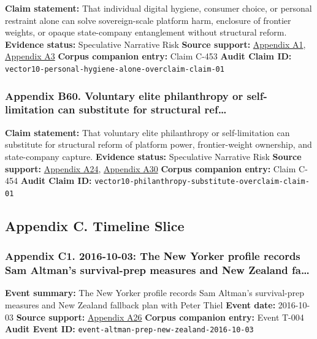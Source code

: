 \documentclass[
  american,
  11pt,
  letterpaper,
]{article}
\begin{document}
\textbf{Claim statement:} That individual digital hygiene, consumer
choice, or personal restraint alone can solve sovereign-scale platform
harm, enclosure of frontier weights, or opaque state-company
entanglement without structural reform. \textbf{Evidence status:}
Speculative Narrative Risk \textbf{Source support:}
\hyperref[appendix-a1-artificial-intelligence-and-the-future-of-teaching-and-learning-insights-and-recommendations]{Appendix
A1},
\hyperref[appendix-a3-interactions-between-artificial-intelligence-and-digital-public-infrastructure-concepts-benefits-and-challenges]{Appendix
A3} \textbf{Corpus companion entry:} Claim C-453 \textbf{Audit Claim
ID:} \texttt{vector10-personal-hygiene-alone-overclaim-claim-01}

\subsubsection{Appendix B60. Voluntary elite philanthropy or
self-limitation can substitute for structural
ref\ldots{}}\label{appendix-b60-voluntary-elite-philanthropy-or-self-limitation-can-substitute-for-structural-ref}

\textbf{Claim statement:} That voluntary elite philanthropy or
self-limitation can substitute for structural reform of platform power,
frontier-weight ownership, and state-company capture. \textbf{Evidence
status:} Speculative Narrative Risk \textbf{Source support:}
\hyperref[appendix-a24-the-adolescence-of-technology]{Appendix A24},
\hyperref[appendix-a30-encyclical-letter-of-his-holiness-leo-xiv-magnifica-humanitas]{Appendix
A30} \textbf{Corpus companion entry:} Claim C-454 \textbf{Audit Claim
ID:} \texttt{vector10-philanthropy-substitute-overclaim-claim-01}

\subsection{Appendix C. Timeline
Slice}\label{appendix-c.-timeline-slice}

\subsubsection{Appendix C1. 2016-10-03: The New Yorker profile records
Sam Altman's survival-prep measures and New Zealand
fa\ldots{}}\label{appendix-c1-2016-10-03-the-new-yorker-profile-records-sam-altman-s-survival-prep-measures-and-new-zealand-fallback-plan-with-peter-thiel}

\textbf{Event summary:} The New Yorker profile records Sam Altman's
survival-prep measures and New Zealand fallback plan with Peter Thiel
\textbf{Event date:} 2016-10-03 \textbf{Source support:}
\hyperref[appendix-a26-sam-altman-s-manifest-destiny]{Appendix A26}
\textbf{Corpus companion entry:} Event T-004 \textbf{Audit Event ID:}
\texttt{event-altman-prep-new-zealand-2016-10-03}
\end{document}

